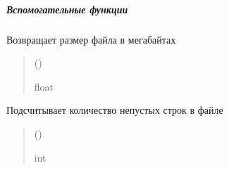 \documentclass[a4paper,11pt,russian,openany,oneside]{sphinxmanual}
\begin{document}
\subparagraph{Вспомогательные функции}
\label{\detokenize{scan_module:id7}}

\begin{savenotes}\begin{fulllineitems}
\label{\detokenize{scan_module:id8}}
\pysigstartsignatures
\pysiglinewithargsret
{}
{}
{}
\pysigstopsignatures
\sphinxAtStartPar
Возвращает размер файла в мегабайтах
\begin{quote}\begin{description}
\sphinxAtStartPar
{} ()

\sphinxAtStartPar
float

\end{description}\end{quote}

\end{fulllineitems}\end{savenotes}


\begin{savenotes}\begin{fulllineitems}
\label{\detokenize{scan_module:id9}}
\pysigstartsignatures
\pysiglinewithargsret
{}
{}
{}
\pysigstopsignatures
\sphinxAtStartPar
Подсчитывает количество непустых строк в файле
\begin{quote}\begin{description}
\sphinxAtStartPar
{} ()

\sphinxAtStartPar
int

\end{description}\end{quote}

\end{fulllineitems}\end{savenotes}
\end{document}
